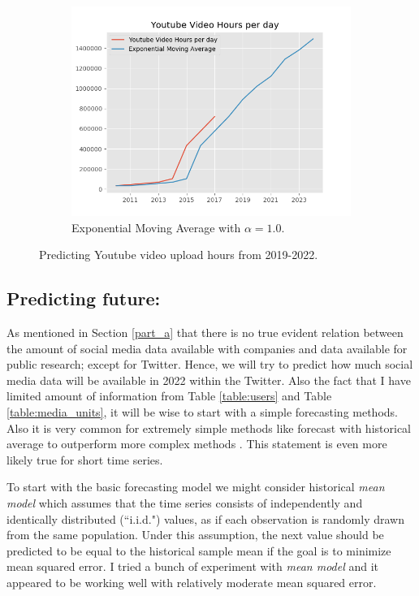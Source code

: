 \begin{figure}[t]
\begin{subfigure}[t]{0.30\linewidth}
\includegraphics[width=\linewidth ]{fig/yt_ema.png}
\caption{{\footnotesize Exponential Moving Average with $\alpha = 1.0$.}}\vspace{-2mm}
\label{fig:pla2}
\end{subfigure}
\caption{Predicting Youtube video upload hours from 2019-2022.}\vspace{-2mm}
\label{fig:youtube_upload}
\end{figure}



\subsection*{Predicting future:}
As mentioned in Section \ref{part_a} that there is no true evident relation between the amount of social media data available with companies and data available for public research; except for Twitter. Hence, we will try to predict how much social media data will be available in 2022 within the Twitter.
Also the fact that I have limited amount of information from Table \ref{table:users} and Table \ref{table:media_units}, it will be wise to start with a simple forecasting methods. Also it is very common for extremely simple methods like forecast with historical average to outperform more complex methods \cite{simple_forecast}. This statement is even more likely true for short time series.



To start with the basic forecasting model we might consider historical {\em mean model} which assumes that the time series consists of independently and identically distributed (``i.i.d.") values, as if each observation is randomly drawn from the same population. Under this assumption, the next value should be predicted to be equal to the historical sample mean if the goal is to minimize mean squared error. I tried a bunch of experiment with {\em mean model} and it appeared to be working well with relatively moderate mean squared error.

